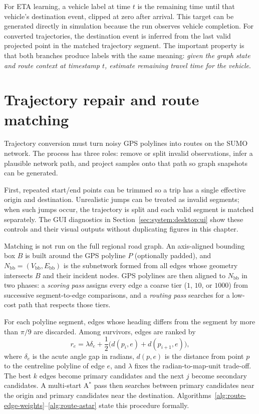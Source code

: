 For ETA learning, a vehicle label at time $t$ is the remaining time until that vehicle's destination event, clipped at zero after arrival. This target can be generated directly in simulation because the run observes vehicle completion. For converted trajectories, the destination event is inferred from the last valid projected point in the matched trajectory segment. The important property is that both branches produce labels with the same meaning: \emph{given the graph state and route context at timestamp $t$, estimate remaining travel time for the vehicle}.

\section{Trajectory repair and route matching}
Trajectory conversion must turn noisy GPS polylines into routes on the SUMO network. The process has three roles: remove or split invalid observations, infer a plausible network path, and project samples onto that path so graph snapshots can be generated.

First, repeated start/end points can be trimmed so a trip has a single effective origin and destination. Unrealistic jumps can be treated as invalid segments; when such jumps occur, the trajectory is split and each valid segment is matched separately. The GUI diagnostics in Section~\ref{sec:system:desktop:ui} show these controls and their visual outputs without duplicating figures in this chapter.

Matching is not run on the full regional road graph. An axis-aligned bounding box $B$ is built around the GPS polyline $P$ (optionally padded), and $N_{\mathrm{bb}}=(V_{\mathrm{bb}},E_{\mathrm{bb}})$ is the subnetwork formed from all edges whose geometry intersects $B$ and their incident nodes. GPS polylines are then aligned to $N_{\mathrm{bb}}$ in two phases: a \emph{scoring pass} assigns every edge a coarse tier ($1$, $10$, or $1000$) from successive segment-to-edge comparisons, and a \emph{routing pass} searches for a low-cost path that respects those tiers.

For each polyline segment, edges whose heading differs from the segment by more than $\pi/9$ are discarded. Among survivors, edges are ranked by
\[
r_e=\lambda\delta_e+\frac{1}{2}\bigl(d(p_i,e)+d(p_{i+1},e)\bigr),
\]
where $\delta_e$ is the acute angle gap in radians, $d(p,e)$ is the distance from point $p$ to the centreline polyline of edge $e$, and $\lambda$ fixes the radian-to-map-unit trade-off. The best $k$ edges become primary candidates and the next $j$ become secondary candidates. A multi-start A$^\ast$ pass then searches between primary candidates near the origin and primary candidates near the destination. Algorithms~\ref{alg:route-edge-weights}--\ref{alg:route-astar} state this procedure formally.

